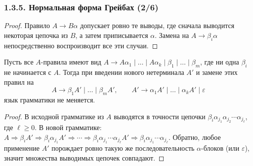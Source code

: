 \documentclass[mathserif,12pt,aspectratio=169]{beamer}
\let\ge\geqslant
\begin{document}
\begin{frame}
\frametitle{1.3.5. Нормальная форма Грейбах (2/6)}


\begin{proof}
Правило $A\to B\alpha$ допускает ровно те выводы, где сначала выводится некоторая цепочка из $B$,
а затем приписывается $\alpha$.
Замена на $A\to \beta_i\alpha$ непосредственно воспроизводит все эти случаи. 
\end{proof}

\begin{lemma}
Пусть все $A$-правила имеют вид
$A\to A\alpha_1\mid \dots \mid A\alpha_k \mid \beta_1\mid \dots \mid \beta_m$,
где ни одна $\beta_i$ не начинается с $A$.
Тогда при введении нового нетерминала $A'$ и замене этих правил на
\[
A\to \beta_1A' \mid \dots \mid \beta_mA',\qquad
A'\to \alpha_1A' \mid \dots \mid \alpha_kA' \mid \varepsilon
\]
язык грамматики не меняется.
\end{lemma}

\begin{proof}
В исходной грамматике из $A$ выводятся в точности цепочки
$\beta_i\alpha_{j_1}\alpha_{j_2}\cdots \alpha_{j_\ell}$, где $\ell\ge 0$.
В новой грамматике:
$A\Rightarrow \beta_iA'\Rightarrow \beta_i\alpha_{j_1}A'\Rightarrow \cdots
\Rightarrow \beta_i\alpha_{j_1}\cdots \alpha_{j_\ell}A'\Rightarrow
\beta_i\alpha_{j_1}\cdots \alpha_{j_\ell}$.
Обратно, любое применение $A'$ порождает ровно такую же последовательность $\alpha$-блоков
(или $\varepsilon$), значит множества выводимых цепочек совпадают.
\end{proof}

\smallskip



\end{frame}
\end{document}
